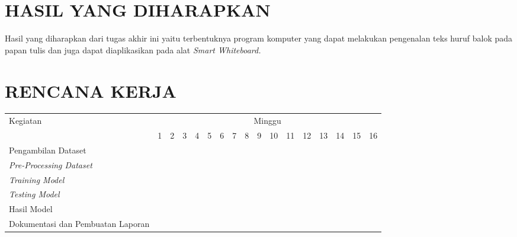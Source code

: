 \section{HASIL YANG DIHARAPKAN}

Hasil yang diharapkan dari tugas akhir ini yaitu terbentuknya program komputer yang dapat melakukan pengenalan teks huruf balok pada papan tulis dan juga dapat diaplikasikan pada alat \textit{Smart Whiteboard.}

\section{RENCANA KERJA}

\newcommand{\w}{}
\newcommand{\G}{\cellcolor{gray}}
\begin{table}[h!]
  \begin{tabular}{|p{4cm}|c|c|c|c|c|c|c|c|c|c|c|c|c|c|c|c|}

    \hline
    \multirow{2}{*}{Kegiatan} & \multicolumn{16}{|c|}{Minggu} \\
    \cline{2-17} &
    1 & 2 & 3 & 4 & 5 & 6 & 7 & 8 & 9 & 10 & 11 & 12 & 13 & 14 & 15 & 16 \\
    \hline

    Pengambilan Dataset &
    \G & \G & \G & \w & \w & \w & \w & \w & \w & \w & \w & \w & \w & \w & \w & \w \\
    \hline

    \textit{Pre-Processing Dataset} &
    \w & \w & \G & \G & \G & \w & \w & \w & \w & \w & \w & \w & \w & \w & \w & \w \\
    \hline

    \textit{Training Model} &
    \w & \w & \w & \w & \G & \G & \G & \G & \G & \w & \w & \w & \w & \w & \w & \w \\
    \hline

    \textit{Testing Model} &
    \w & \w & \w & \w & \w & \w & \G & \G & \G & \G & \G & \w & \w & \w & \w & \w \\
    \hline
    
    Hasil Model &
    \w & \w & \w & \w & \w & \w & \w & \w & \G & \G & \G & \G & \G & \G & \w & \w \\
    \hline

    Dokumentasi dan Pembuatan Laporan &
    \G & \G & \G & \G & \G & \G & \G & \G & \G & \G & \G & \G & \G & \G & \G & \G \\
    \hline

  \end{tabular}
\end{table}